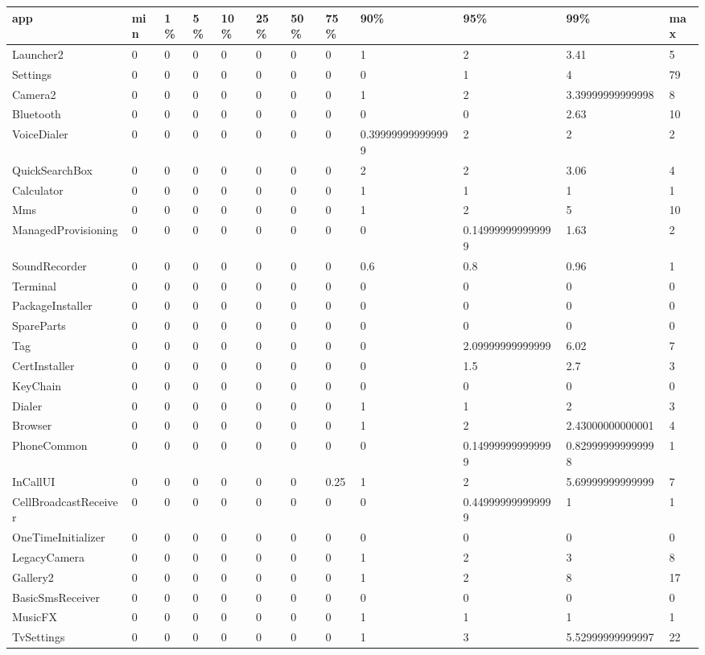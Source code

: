 \documentclass[a4paper]{article}
\begin{document}
\begin{tabular}{|l|l|l|l|l|l|l|l|l|l|l|l|}
\hline
app&min&1\%&5\%&10\%&25\%&50\%&75\%&90\%&95\%&99\%&max\\
\hline
Launcher2&0&0&0&0&0&0&0&1&2&3.41&5\\
\hline
Settings&0&0&0&0&0&0&0&0&1&4&79\\
\hline
Camera2&0&0&0&0&0&0&0&1&2&3.39999999999998&8\\
\hline
Bluetooth&0&0&0&0&0&0&0&0&0&2.63&10\\
\hline
VoiceDialer&0&0&0&0&0&0&0&0.399999999999999&2&2&2\\
\hline
QuickSearchBox&0&0&0&0&0&0&0&2&2&3.06&4\\
\hline
Calculator&0&0&0&0&0&0&0&1&1&1&1\\
\hline
Mms&0&0&0&0&0&0&0&1&2&5&10\\
\hline
ManagedProvisioning&0&0&0&0&0&0&0&0&0.149999999999999&1.63&2\\
\hline
SoundRecorder&0&0&0&0&0&0&0&0.6&0.8&0.96&1\\
\hline
Terminal&0&0&0&0&0&0&0&0&0&0&0\\
\hline
PackageInstaller&0&0&0&0&0&0&0&0&0&0&0\\
\hline
SpareParts&0&0&0&0&0&0&0&0&0&0&0\\
\hline
Tag&0&0&0&0&0&0&0&0&2.09999999999999&6.02&7\\
\hline
CertInstaller&0&0&0&0&0&0&0&0&1.5&2.7&3\\
\hline
KeyChain&0&0&0&0&0&0&0&0&0&0&0\\
\hline
Dialer&0&0&0&0&0&0&0&1&1&2&3\\
\hline
Browser&0&0&0&0&0&0&0&1&2&2.43000000000001&4\\
\hline
PhoneCommon&0&0&0&0&0&0&0&0&0.149999999999999&0.829999999999998&1\\
\hline
InCallUI&0&0&0&0&0&0&0.25&1&2&5.69999999999999&7\\
\hline
CellBroadcastReceiver&0&0&0&0&0&0&0&0&0.449999999999999&1&1\\
\hline
OneTimeInitializer&0&0&0&0&0&0&0&0&0&0&0\\
\hline
LegacyCamera&0&0&0&0&0&0&0&1&2&3&8\\
\hline
Gallery2&0&0&0&0&0&0&0&1&2&8&17\\
\hline
BasicSmsReceiver&0&0&0&0&0&0&0&0&0&0&0\\
\hline
MusicFX&0&0&0&0&0&0&0&1&1&1&1\\
\hline
TvSettings&0&0&0&0&0&0&0&1&3&5.52999999999997&22\\

\end{tabular}
\end{document}
